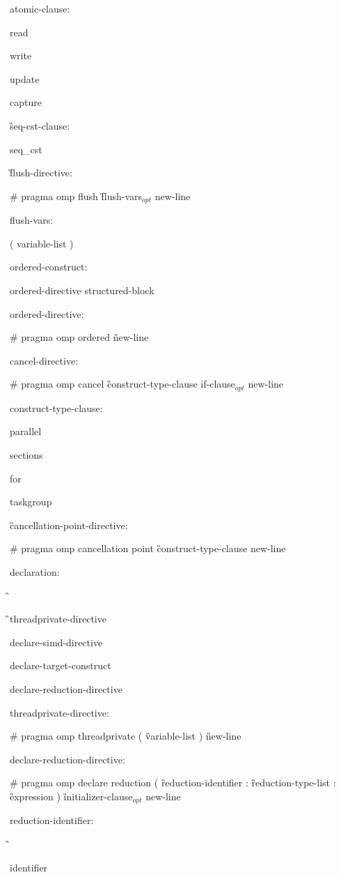 {atomic-clause:

\C\I read

\I write

\I update

\I capture

\G seq-cst-clause:

\C\I seq\_cst

\G flush-directive:

\C\I \# pragma omp flush \G flush-vars$_{opt}$ new-line

flush-vars:

\I ( variable-list )

ordered-construct:

\I ordered-directive structured-block

ordered-directive:

\C\I \# pragma omp ordered \G new-line

cancel-directive:

\C\I \# pragma omp cancel \G construct-type-clause if-clause$_{opt}$ new-line

construct-type-clause:

\C\I parallel

\I sections

\I for

\I taskgroup

\G cancellation-point-directive:

\C\I \# pragma omp cancellation point \G construct-type-clause new-line

declaration:

\G{}

\G\I threadprivate-directive

\I declare-simd-directive

\I declare-target-construct

\I declare-reduction-directive

threadprivate-directive:

\C\I \# pragma omp threadprivate ( \G variable-list \C ) \G new-line

declare-reduction-directive:

\C\I \# pragma omp declare reduction ( \G reduction-identifier \C : \G reduction-type-list \C : \G expression \C ) \G initializer-clause$_{opt}$ new-line

reduction-identifier: 

\G\cspecificstart

\I identifier 

}
